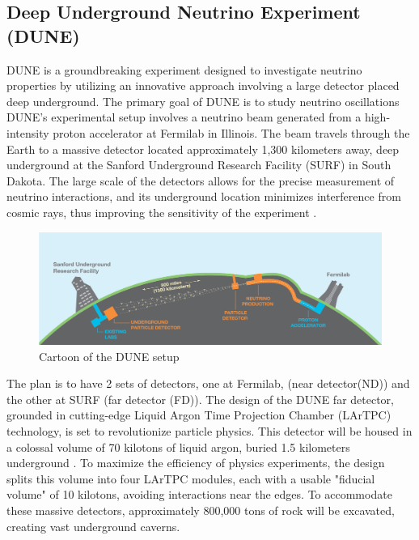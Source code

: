 \subsection{Deep Underground Neutrino Experiment (DUNE)}

DUNE is a groundbreaking experiment designed to investigate neutrino properties by utilizing an innovative approach involving a large detector placed deep underground.
The primary goal of DUNE is to study neutrino oscillations
DUNE's experimental setup involves a neutrino beam generated from a high-intensity proton accelerator at Fermilab in Illinois.
The beam travels through the Earth to a massive detector located approximately 1,300 kilometers away, deep underground at the Sanford Underground Research Facility (SURF) in South Dakota.
The large scale of the detectors allows for the precise measurement of neutrino interactions, and its underground location minimizes interference from cosmic rays, thus improving the sensitivity of the experiment \cite{DUNE_Neut_Det}.

\begin{figure}[H]
  \centering
  \includegraphics[width=120mm]{figures/dune.png}
  \caption{Cartoon of the DUNE setup \cite{DUNE_2020}}
  \label{dune}
\end{figure}

The plan is to have 2 sets of detectors, one at Fermilab, (near detector(ND)) and the other at SURF (far detector (FD)).
The design of the DUNE far detector, grounded in cutting-edge Liquid Argon Time Projection Chamber (LArTPC) technology, is set to revolutionize particle physics.
This detector will be housed in a colossal volume of 70 kilotons of liquid argon, buried 1.5 kilometers underground \cite{DUNE_LBNF}.
To maximize the efficiency of physics experiments, the design splits this volume into four LArTPC modules, each with a usable "fiducial volume" of 10 kilotons, avoiding interactions near the edges.
To accommodate these massive detectors, approximately 800,000 tons of rock will be excavated, creating vast underground caverns.

